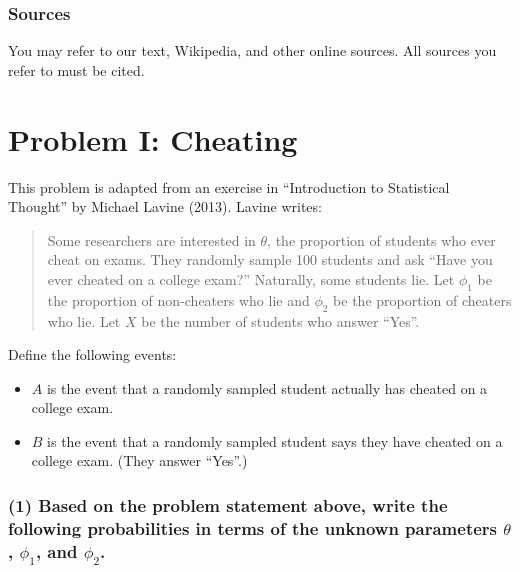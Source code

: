 \documentclass[]{article}
\providecommand{\tightlist}{%
  \setlength{\itemsep}{0pt}\setlength{\parskip}{0pt}}
\begin{document}
\hypertarget{sources}{%
\subsubsection{Sources}\label{sources}}

You may refer to our text, Wikipedia, and other online sources. All
sources you refer to must be cited.

\hypertarget{problem-i-cheating}{%
\section{Problem I: Cheating}\label{problem-i-cheating}}

This problem is adapted from an exercise in ``Introduction to
Statistical Thought'' by Michael Lavine (2013). Lavine writes:

\begin{quote}
Some researchers are interested in \(\theta\), the proportion of
students who ever cheat on exams. They randomly sample 100 students and
ask ``Have you ever cheated on a college exam?'' Naturally, some
students lie. Let \(\phi_1\) be the proportion of non-cheaters who lie
and \(\phi_2\) be the proportion of cheaters who lie. Let \(X\) be the
number of students who answer ``Yes''.
\end{quote}

Define the following events:

\begin{itemize}
\tightlist
\item
  \(A\) is the event that a randomly sampled student actually has
  cheated on a college exam.
\item
  \(B\) is the event that a randomly sampled student says they have
  cheated on a college exam. (They answer ``Yes''.)
\end{itemize}

\hypertarget{based-on-the-problem-statement-above-write-the-following-probabilities-in-terms-of-the-unknown-parameters-theta-phi_1-and-phi_2.}{%
\subsubsection{\texorpdfstring{(1) Based on the problem statement above,
write the following probabilities in terms of the unknown parameters
\(\theta\), \(\phi_1\), and
\(\phi_2\).}{(1) Based on the problem statement above, write the following probabilities in terms of the unknown parameters \textbackslash{}theta, \textbackslash{}phi\_1, and \textbackslash{}phi\_2.}}\label{based-on-the-problem-statement-above-write-the-following-probabilities-in-terms-of-the-unknown-parameters-theta-phi_1-and-phi_2.}}
\end{document}
